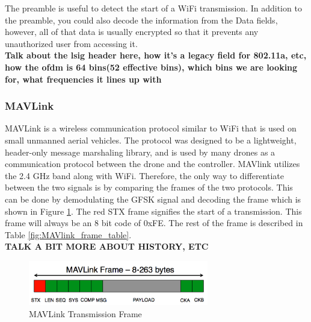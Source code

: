 The preamble is useful to detect the start of a WiFi transmission. In addition to the preamble, you could also decode the information from the Data fields, however, all of that data is usually encrypted so that it prevents any unauthorized user from accessing it\cite{wifi_book}.
\\ \textbf{Talk about the lsig header here, how it's a legacy field for 802.11a, etc, how the ofdm is 64 bins(52 effective bins), which bins we are looking for, what frequencies it lines up with}

\subsubsection{MAVLink}
MAVLink is a wireless communication protocol similar to WiFi that is used on small unmanned aerial vehicles. The protocol was designed to be a lightweight, header-only message marshaling library, and is used by many drones as a communication protocol between the drone and the controller. MAVlink utilizes the 2.4 GHz band along with WiFi. Therefore, the only way to differentiate between the two signals is by comparing the frames of the two protocols. This can be done by demodulating the GFSK signal and decoding the frame which is shown in Figure \ref{fig:MAVlink_frame}. The red STX frame signifies the start of a transmission. This frame will always be an 8 bit code of 0xFE. The rest of the frame is described in Table \ref{fig:MAVlink_frame_table}.
\\ \textbf{TALK A BIT MORE ABOUT HISTORY, ETC} 
\begin{figure}[ht]
\centering
\includegraphics[width=0.70\textwidth]{img/mavlink-packet.png}
\caption{MAVLink Transmission Frame}
\label{fig:MAVlink_frame}
\end{figure}
